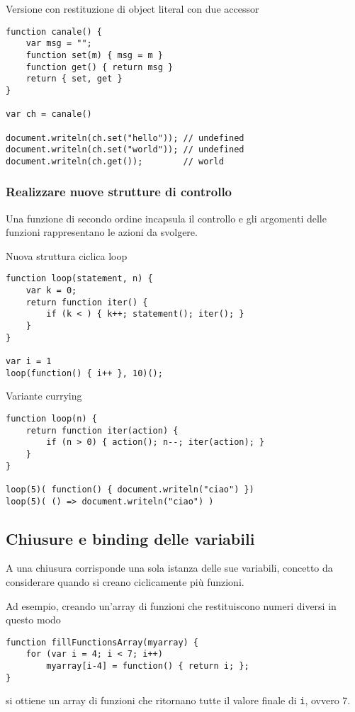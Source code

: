 Versione con restituzione di object literal con due accessor
\begin{verbatim}
function canale() {
    var msg = "";
    function set(m) { msg = m }
    function get() { return msg }
    return { set, get }
}

var ch = canale()

document.writeln(ch.set("hello")); // undefined
document.writeln(ch.set("world")); // undefined
document.writeln(ch.get());        // world
\end{verbatim}

\subsubsection{Realizzare nuove strutture di controllo}
Una funzione di secondo ordine incapsula il controllo e gli argomenti delle funzioni rappresentano le azioni da svolgere.

Nuova struttura ciclica loop
\begin{verbatim}
function loop(statement, n) {
    var k = 0;
    return function iter() {
        if (k < ) { k++; statement(); iter(); }
    }
}

var i = 1
loop(function() { i++ }, 10)();
\end{verbatim}

Variante currying
\begin{verbatim}
function loop(n) {
    return function iter(action) {
        if (n > 0) { action(); n--; iter(action); }
    }
}

loop(5)( function() { document.writeln("ciao") })
loop(5)( () => document.writeln("ciao") )
\end{verbatim}

\subsection{Chiusure e binding delle variabili}
A una chiusura corrisponde una sola istanza delle sue variabili, concetto da considerare quando si creano ciclicamente più funzioni.

Ad esempio, creando un'array di funzioni che restituiscono numeri diversi in questo modo
\begin{verbatim}
function fillFunctionsArray(myarray) {
    for (var i = 4; i < 7; i++)
        myarray[i-4] = function() { return i; };
}
\end{verbatim}
si ottiene un array di funzioni che ritornano tutte il valore finale di \texttt{i}, ovvero 7.

